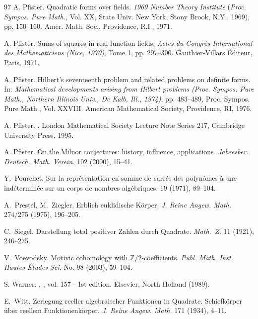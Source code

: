 \documentclass[12pt,leqno]{amsart}
\newcommand{\zz}{\mathbb Z}
\numberwithin{equation}{section}
\theoremstyle{definition}
\theoremstyle{plain}
\begin{document}
\begin{thebibliography}{97}
A. Pfister.
Quadratic forms over fields. {\em 1969 Number Theory Institute} ({\em Proc. Sympos. Pure Math.}, Vol. XX, State Univ. New York, Stony Brook, N.Y., 1969), pp. 150--160. Amer. Math. Soc., Providence, R.I., 1971.

A. Pfister.
Sums of squares in real function fields.
{\em Actes du Congrès International des Mathématiciens (Nice, 1970)}, Tome 1, pp. 297--300.
Gauthier-Villars Éditeur, Paris, 1971.

A. Pfister.
Hilbert's seventeenth problem and related problems on definite forms.
In: {\em Mathematical developments arising from Hilbert problems
(Proc. Sympos. Pure Math., Northern Illinois Univ., De Kalb, Ill., 1974)}, pp. 483--489,
Proc. Sympos. Pure Math., Vol. XXVIII.
American Mathematical Society, Providence, RI, 1976.

A. Pfister.
.
London Mathematical Society Lecture Note Series 217, Cambridge University Press, 1995.

A. Pfister.
On the Milnor conjectures: history, influence, applications.
{\em Jahresber. Deutsch. Math. Verein.} 102 (2000), 15--41.

Y.~Pourchet.
Sur la représentation en somme de carrés des polynômes à une indéterminée sur un corps de nombres algébriques.
 19 (1971), 89--104.

A.~Prestel, M.~Ziegler.
Erblich euklidische K\"orper.
\emph{J. Reine Angew. Math.} 274/275 (1975), 196--205.

C.~Siegel. Darstellung total positiver Zahlen durch Quadrate. {\em Math.~Z.} 11 (1921),  246--275.

V.~Voevodsky. Motivic cohomology with $\zz/2$-coefficients. {\em Publ. Math. Inst. Hautes Études Sci.} No. 98 (2003), 59--104.

S. Warner.
,
, vol. 157 - 1st edition. Elsevier, North Holland (1989).

E.~Witt.
Zerlegung reeller algebraischer Funktionen in Quadrate. Schiefkörper über reellem Funktionenkörper.
{\em J. Reine Angew. Math.} 171 (1934), 4--11.

\end{thebibliography}
\end{document}

